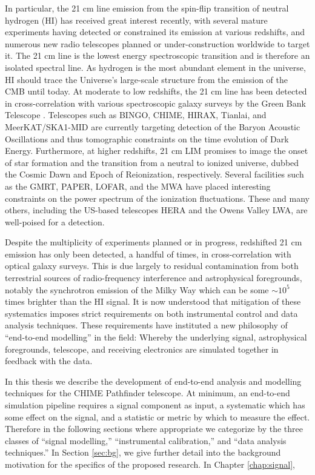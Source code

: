 In particular, the 21 cm line emission from the spin-flip transition of neutral hydrogen (HI) has received great interest recently, with several mature experiments having detected or constrained its emission at various redshifts, and numerous new radio telescopes planned or under-construction worldwide to target it. The 21 cm line is the lowest energy spectroscopic transition and is therefore an isolated spectral line. As hydrogen is the most abundant element in the universe, HI should trace the Universe's large-scale structure from the emission of the CMB until today. At moderate to low redshifts, the 21 cm line has been detected in cross-correlation with various spectroscopic galaxy surveys by the Green Bank Telescope \cite{changetal, masuietalgbt, switzeretalgbt, andersonetalparkes}. Telescopes such as BINGO, CHIME, HIRAX, Tianlai, and MeerKAT/SKA1-MID are currently targeting detection of the Baryon Acoustic Oscillations and thus tomographic constraints on the time evolution of Dark Energy. Furthermore, at higher redshifts, 21 cm LIM promises to image the onset of star formation and the transition from a neutral to ionized universe, dubbed the Cosmic Dawn and Epoch of Reionization, respectively. Several facilities such as the GMRT, PAPER, LOFAR, and the MWA have placed interesting constraints on the power spectrum of the ionization fluctuations. These and many others, including the US-based telescopes HERA \cite{hera} and the Owens Valley LWA, are well-poised for a detection.

Despite the multiplicity of experiments planned or in progress, redshifted 21 cm emission has only been detected, a handful of times, in cross-correlation with optical galaxy surveys. This is due largely to residual contamination from both terrestrial sources of radio-frequency interference and astrophysical foregrounds, notably the synchrotron emission of the Milky Way which can be some $\sim 10^5$ times brighter than the HI signal. It is now understood that mitigation of these systematics imposes strict requirements on both instrumental control and data analysis techniques. These requirements have instituted a new philosophy of ``end-to-end modelling'' in the field: Whereby the underlying signal, astrophysical foregrounds, telescope, and receiving electronics are simulated together in feedback with the data.

In this thesis we describe the development of end-to-end analysis and modelling techniques for the CHIME Pathfinder telescope. At minimum, an end-to-end simulation pipeline requires a signal component as input, a systematic which has some effect on the signal, and a statistic or metric by which to measure the effect. Therefore in the following sections where appropriate we categorize by the three classes of ``signal modelling,'' ``instrumental calibration,'' and ``data analysis techniques.'' In Section \ref{sec:bg}, we give further detail into the background motivation for the specifics of the proposed research. In Chapter \ref{chap:signal},

